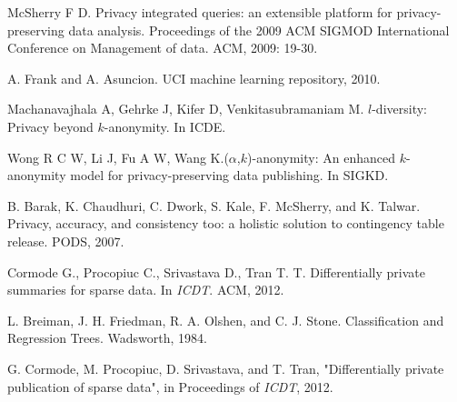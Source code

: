 \begin{thebibliography}{1}
McSherry F D. Privacy integrated queries: an extensible platform for privacy-preserving data analysis. Proceedings of the 2009 ACM SIGMOD International Conference on Management of data. ACM, 2009: 19-30.

A. Frank and A. Asuncion. UCI machine learning repository, 2010.




 Machanavajhala A, Gehrke J, Kifer D, Venkitasubramaniam M. $l$-diversity: Privacy beyond $k$-anonymity. In ICDE.


 Wong R C W, Li J, Fu A W, Wang K.($\alpha$,$k$)-anonymity: An enhanced $k$-anonymity model for privacy-preserving data publishing. In SIGKD.





B. Barak, K. Chaudhuri, C. Dwork, S. Kale, F. McSherry, and K. Talwar. Privacy, accuracy, and consistency too: a holistic solution to contingency table release. PODS, 2007.





Cormode G., Procopiuc C., Srivastava D., Tran T. T. Differentially private summaries for sparse data. In {\it ICDT}. ACM, 2012.










 L. Breiman, J. H. Friedman, R. A. Olshen, and C. J. Stone. Classification and Regression Trees. Wadsworth, 1984.

G. Cormode, M. Procopiuc, D. Srivastava, and T. Tran, "Differentially
private publication of sparse data", in Proceedings of {\it ICDT}, 2012.

\end{thebibliography}